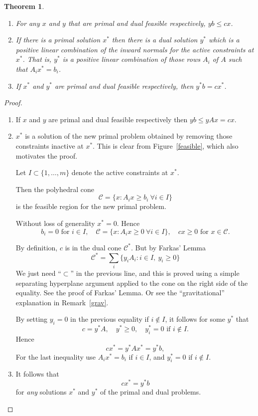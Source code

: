 \documentclass[a4paper]{amsart}
\theoremstyle{plain}
\newtheorem{theorem}{Theorem}[section]
\theoremstyle{definition}
\theoremstyle{remark}
\begin{document}
\begin{theorem}\mbox{}
\begin{enumerate}
\item For any $ x $ and $ y $ that are primal and dual feasible respectively, $ yb \leq cx $.
\item If there is a primal solution $ x^* $ then there is a dual solution $ y^* $ which is a \emph{positive} linear combination of the inward normals for the active constraints at $ x^* $.  That is, $ y^* $   is a \emph{positive} linear combination of those rows $ A_i $ of $ A $ such that $ A_i x^* = b_i $.
\item If $ x^* $ and $ y^* $   are primal and dual feasible respectively, then $ y^*b  = cx^* $.
\end{enumerate} 
\end{theorem} 

\begin{proof} \mbox{}
\begin{enumerate}

\item If $ x $ and $ y $   are primal and dual feasible respectively then $ yb \leq yAx = cx $.
\medskip

\item $ x^* $ is a solution of the new primal problem obtained by removing those constraints inactive at $ x^* $. This is clear from Figure~\ref{feasible}, which also motivates the proof. 

Let $ I \subset \{1,\dots, m\} $ denote the active constraints at $ x^* $.

Then the polyhedral cone
\[
 \mathcal{C} = \{x : A_i x  \geq b_i\  \forall i\in I \}  
 \]
is the feasible region for the new primal problem. 

Without loss of generality $ x^* = 0 $. Hence  
\[  b_i = 0   \text{ for }  i\in I ,\quad 
 \mathcal{C} = \{ x : A_ix \geq 0\ \forall i\in I \}  , \quad    cx\geq 0 \text{ for } x \in \mathcal{C}  .
 \]

By definition,   $ c $ is in the dual cone $ \mathcal{C} ^* $.
But by Farkas' Lemma
\[
 \mathcal{C} ^* =   \sum_i \big\{ y_iA_i :   i \in I,\ y_i\geq 0   \big\}
 \]
We just need ``$ \subset $'' in the previous line, and this is proved using a simple separating hyperplane argument applied to the cone on the right side of the equality.  See the proof of Farkas' Lemma.  Or see the ``gravitational'' explanation  in Remark~\ref{grav}.

\medskip
By setting  $ y_i=0 $ in the previous equality  if $ i \notin I $, it follows for some $ y^* $ that 
\[
c = y^* A, \quad y^* \geq 0, \quad y_i^*=0 \text{ if } i \notin I .
\]
Hence
\[  
cx^* = y^*Ax^* = y^* b,
\]
For the last inequality use $ A_ix^*=b_i $ if $ i \in I $,  and   $ y_i^*=0 $ if $ i \notin I $. 

\medskip
\item It follows that 
\[
cx^* = y^* b 
\]
for \emph{any} solutions $ x^* $ and $ y^* $ of the primal and dual problems.
\end{enumerate} 

\end{proof}
\end{document}

